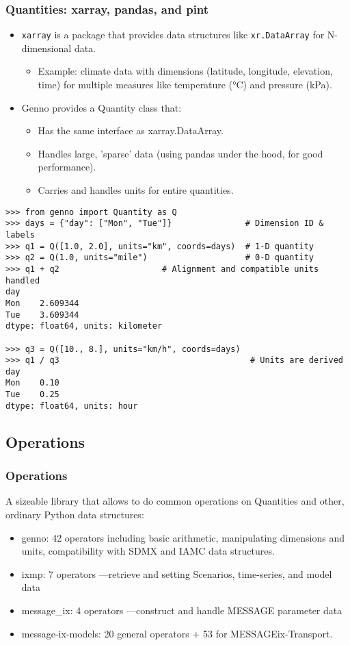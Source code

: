 \documentclass[12pt,aspectratio=169]{beamer}
\renewcommand{\mod}[1]{\texttt{#1}}
\newcommand{\py}[1]{\texttt{#1}}
\begin{document}
\begin{frame}
\frametitle{Quantities: xarray, pandas, and pint}
\begin{itemize}
  \item \mod{xarray} is a package that provides data structures like \py{xr.DataArray} for N-dimensional data.
    \begin{itemize}
      \item Example: climate data with dimensions (latitude, longitude, elevation, time)
      for multiple measures like temperature (°C) and pressure (kPa).
    \end{itemize}
  \item Genno provides a Quantity class that:
    \begin{itemize}
      \item Has the same interface as xarray.DataArray.
      \item Handles large, 'sparse' data (using pandas under the hood, for good performance).
      \item Carries and handles units for entire quantities.
    \end{itemize}
\end{itemize}

\begin{verbatim}
>>> from genno import Quantity as Q
>>> days = {"day": ["Mon", "Tue"]}               # Dimension ID & labels
>>> q1 = Q([1.0, 2.0], units="km", coords=days)  # 1-D quantity
>>> q2 = Q(1.0, units="mile")                    # 0-D quantity
>>> q1 + q2                     # Alignment and compatible units handled
day
Mon    2.609344
Tue    3.609344
dtype: float64, units: kilometer

>>> q3 = Q([10., 8.], units="km/h", coords=days)
>>> q1 / q3                                       # Units are derived
day
Mon    0.10
Tue    0.25
dtype: float64, units: hour
\end{verbatim}
\end{frame}

\subsection{Operations}

\begin{frame}[allowframebreaks]
\frametitle{ Operations}
A sizeable library that allows to do common operations on Quantities and other, ordinary Python data structures:

\begin{itemize}
  \item genno: 42 operators including basic arithmetic, manipulating dimensions and units, compatibility with SDMX and IAMC data structures.
  \item ixmp: 7 operators —retrieve and setting Scenarios, time-series, and model data
  \item message_ix: 4 operators —construct and handle MESSAGE parameter data
  \item message-ix-models: 20 general operators + 53 for MESSAGEix-Transport.
\end{itemize}
\end{frame}
\end{document}
